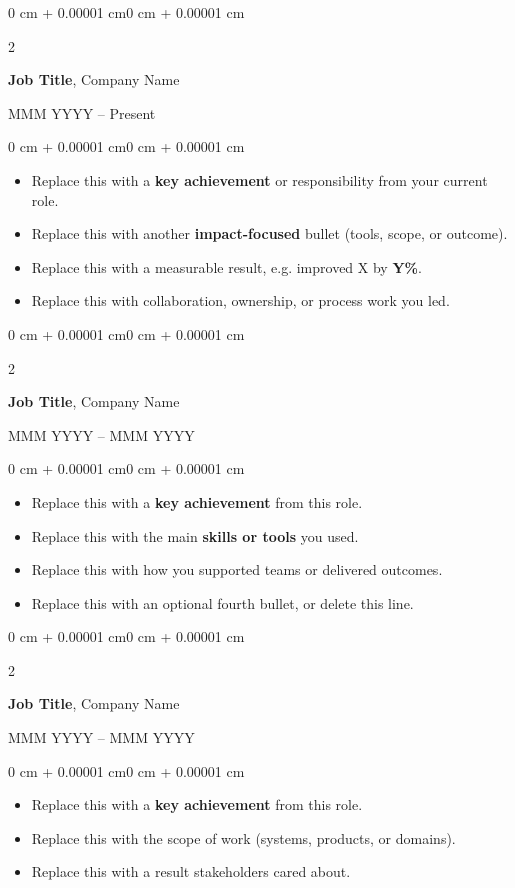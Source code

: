 \documentclass[10pt, letterpaper]{article}
\newenvironment{highlights}{
    \begin{itemize}[
        topsep=0.06 cm,
        parsep=0.06 cm,
        partopsep=0pt,
        itemsep=0.03 cm,
        leftmargin=0 cm + 10pt
    ]
}{
    \end{itemize}
}
\newenvironment{onecolentry}{
    \begin{adjustwidth}{0 cm + 0.00001 cm}{0 cm + 0.00001 cm}
}{
    \end{adjustwidth}
}
\newenvironment{twocolentry}[2][]{
    \onecolentry
    \def\secondColumn{#2}
    \setcolumnwidth{\fill, 4.5 cm}
    \begin{paracol}{2}
}{
    \switchcolumn \raggedleft \secondColumn
    \end{paracol}
    \endonecolentry
}
\begin{document}
        \begin{twocolentry}{
            MMM YYYY -- Present
        }
            \textbf{Job Title}, Company Name
        \end{twocolentry}
        \vspace{0.10 cm}
        \begin{onecolentry}
            \begin{highlights}
                \item Replace this with a \textbf{key achievement} or responsibility from your current role.
                \item Replace this with another \textbf{impact-focused} bullet (tools, scope, or outcome).
                \item Replace this with a measurable result, e.g. improved X by \textbf{Y\%}.
                \item Replace this with collaboration, ownership, or process work you led.
            \end{highlights}
        \end{onecolentry}

        \begin{twocolentry}{
            MMM YYYY -- MMM YYYY
        }
            \textbf{Job Title}, Company Name
        \end{twocolentry}
        \vspace{0.10 cm}
        \begin{onecolentry}
            \begin{highlights}
                \item Replace this with a \textbf{key achievement} from this role.
                \item Replace this with the main \textbf{skills or tools} you used.
                \item Replace this with how you supported teams or delivered outcomes.
                \item Replace this with an optional fourth bullet, or delete this line.
            \end{highlights}
        \end{onecolentry}

        \begin{twocolentry}{
            MMM YYYY -- MMM YYYY
        }
            \textbf{Job Title}, Company Name
        \end{twocolentry}
        \vspace{0.10 cm}
        \begin{onecolentry}
            \begin{highlights}
                \item Replace this with a \textbf{key achievement} from this role.
                \item Replace this with the scope of work (systems, products, or domains).
                \item Replace this with a result stakeholders cared about.
            \end{highlights}
        \end{onecolentry}
\end{document}
